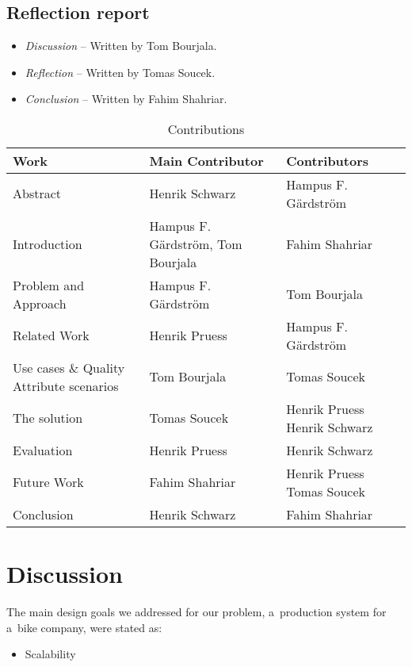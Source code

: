 \documentclass[conference]{IEEEtran}
\begin{document}
\subsection{Reflection report}
\begin{itemize}
    \item \textit{Discussion} -- Written by Tom Bourjala.
    \item \textit{Reflection} -- Written by Tomas Soucek.
    \item \textit{Conclusion} -- Written by Fahim Shahriar.
\end{itemize}

\begin{table}[]
\centering
\caption{Contributions}
\begin{tabular}{|p{2cm}|p{2cm}|p{3cm}|}
\hline
\textbf{Work} & \textbf{Main Contributor} & \textbf{Contributors} \\ \hline
 Abstract & Henrik Schwarz & Hampus F. Gärdström \\    \hline
 Introduction & Hampus F. Gärdström, Tom Bourjala & Fahim Shahriar \\ \hline
 Problem and Approach & Hampus F. Gärdström &  Tom Bourjala \\ \hline
 Related Work & Henrik Pruess & Hampus F. Gärdström\\ \hline
 Use cases \& Quality Attribute scenarios & Tom Bourjala  & Tomas Soucek \\ \hline
 The solution & Tomas Soucek & Henrik Pruess \newline Henrik Schwarz\\ \hline
 Evaluation & Henrik Pruess &  Henrik Schwarz \\ \hline
 Future Work & Fahim Shahriar & Henrik Pruess \newline Tomas Soucek \\ \hline
 Conclusion & Henrik Schwarz & Fahim Shahriar \\ \hline


\end{tabular}%
\label{tab:cb}
\end{table}

\section{Discussion}
The main design goals we addressed for our problem, a~production system for a~bike company, were stated as:
\begin{itemize}
    \item Scalability
\end{itemize}
\end{document}
